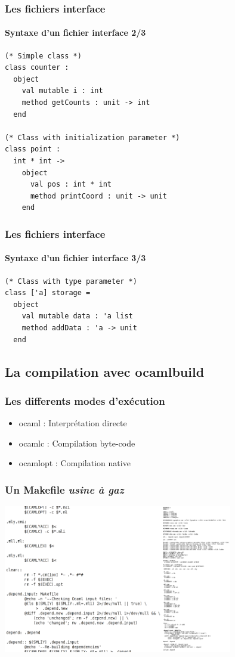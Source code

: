 \begin{frame}[fragile]
	\frametitle{Les fichiers interface}
	\framesubtitle{Syntaxe d'un fichier interface 2/3}
	\lstset{basicstyle=\small}
	\begin{lstlisting}
(* Simple class *)
class counter :
  object
    val mutable i : int
    method getCounts : unit -> int
  end

(* Class with initialization parameter *)
class point :
  int * int -> 
    object
      val pos : int * int
      method printCoord : unit -> unit
    end
	\end{lstlisting}
\end{frame}

\begin{frame}[fragile]
	\frametitle{Les fichiers interface}
	\framesubtitle{Syntaxe d'un fichier interface 3/3}
	\lstset{basicstyle=\small}
	\begin{lstlisting}
(* Class with type parameter *)
class ['a] storage = 
  object 
    val mutable data : 'a list
    method addData : 'a -> unit 
  end
	\end{lstlisting}
\end{frame}

\subsection{La compilation avec ocamlbuild} %
\begin{frame}[fragile]
	\frametitle{Les differents modes d'exécution}
	\huge
	\begin{itemize}
		\item ocaml : Interprétation directe 
		\item ocamlc : Compilation byte-code
		\item ocamlopt : Compilation native
	\end{itemize}
	\normalsize
\end{frame}

\begin{frame}
	\frametitle{Un Makefile \textit{usine à gaz}}
	\begin{center}
		\includegraphics[width=10cm]{pics/mkfile.png}
	\end{center}
\end{frame}

